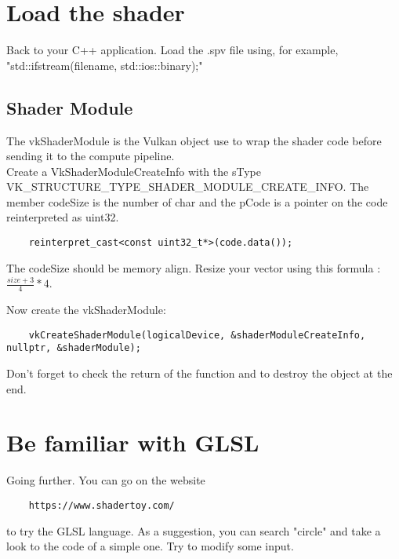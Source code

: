 \documentclass{article}
\begin{document}
\section{Load the shader}
Back to your C++ application. Load the .spv file using, for example, "std::ifstream(filename, std::ios::binary);"

\subsection{Shader Module}
The vkShaderModule is the Vulkan object use to wrap the shader code before sending it to the compute pipeline.\\
Create a VkShaderModuleCreateInfo with the sType VK\_STRUCTURE\_TYPE\_SHADER\_MODULE\_CREATE\_INFO. The member codeSize is the number of char and the pCode is a pointer on the code reinterpreted as uint32.

\begin{lstlisting}
	reinterpret_cast<const uint32_t*>(code.data());
\end{lstlisting}

The codeSize should be memory align. Resize your vector using this formula : $\frac{size + 3}{4}*4$.

Now create the vkShaderModule:

\begin{lstlisting}
	vkCreateShaderModule(logicalDevice, &shaderModuleCreateInfo, nullptr, &shaderModule);
\end{lstlisting}

Don't forget to check the return of the function and to destroy the object at the end.

\section{Be familiar with GLSL}
Going further.
You can go on the website 
\begin{lstlisting}
	https://www.shadertoy.com/
\end{lstlisting}
to try the GLSL language. As a suggestion, you can search "circle" and take a look to the code of a simple one. Try to modify some input. 
\end{document}
